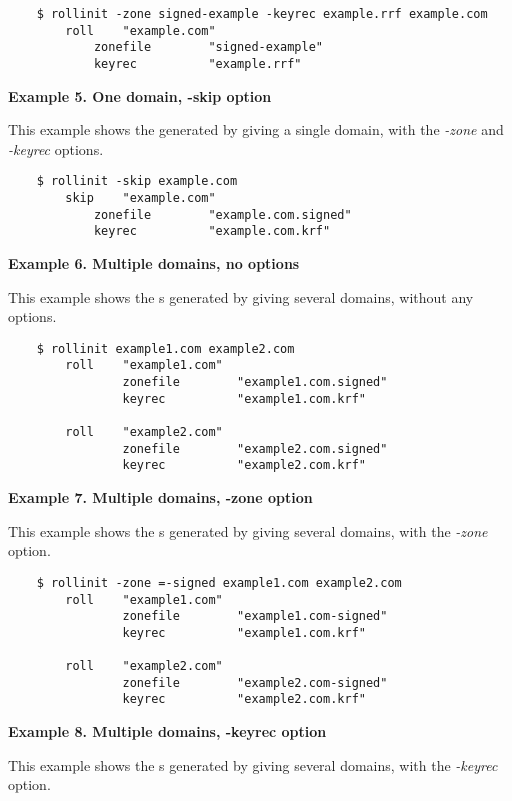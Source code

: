\begin{verbatim}
    $ rollinit -zone signed-example -keyrec example.rrf example.com
        roll    "example.com"
            zonefile        "signed-example"
            keyrec          "example.rrf"
\end{verbatim}

{\bf Example 5.  One domain, -skip option}

This example shows the  generated by giving  a
single domain, with the {\it -zone} and {\it -keyrec} options.

\begin{verbatim}
    $ rollinit -skip example.com
        skip    "example.com"
            zonefile        "example.com.signed"
            keyrec          "example.com.krf"
\end{verbatim}

{\bf Example 6.  Multiple domains, no options}

This example shows the s generated by giving 
several domains, without any options.

\begin{verbatim}
    $ rollinit example1.com example2.com
        roll    "example1.com"
                zonefile        "example1.com.signed"
                keyrec          "example1.com.krf"

        roll    "example2.com"
                zonefile        "example2.com.signed"
                keyrec          "example2.com.krf"
\end{verbatim}

{\bf Example 7.  Multiple domains, -zone option}

This example shows the s generated by giving 
several domains, with the {\it -zone} option.

\begin{verbatim}
    $ rollinit -zone =-signed example1.com example2.com
        roll    "example1.com"
                zonefile        "example1.com-signed"
                keyrec          "example1.com.krf"

        roll    "example2.com"
                zonefile        "example2.com-signed"
                keyrec          "example2.com.krf"
\end{verbatim}

{\bf Example 8.  Multiple domains, -keyrec option}

This example shows the s generated by giving 
several domains, with the {\it -keyrec} option.

